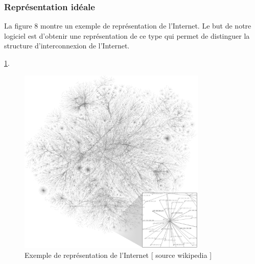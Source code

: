 \subsubsection{Représentation idéale}
La figure 8 montre un exemple de représentation de l'Internet. Le but de notre logiciel est d'obtenir une représentation de ce type qui permet de distinguer la structure d'interconnexion de l'Internet.

 \ref{ideal}. 
\begin{figure}[H]
\begin{center}
        \includegraphics[width=0.8\textwidth]{./schema/Internet_map_1024_transparent.png}
\caption{Exemple de représentation de l'Internet [ source wikipedia ] }
\label{ideal}
\end{center}
\end{figure}

